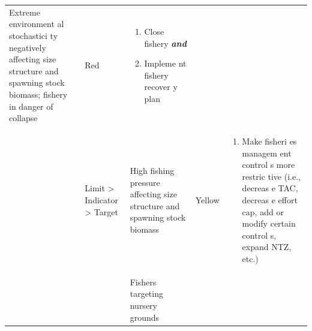 \documentclass[]{book}
\providecommand{\tightlist}{%
  \setlength{\itemsep}{0pt}\setlength{\parskip}{0pt}}
\begin{document}
\begin{longtable}[]{@{}lllll@{}}
\begin{minipage}[t]{0.19\columnwidth}
Extreme environment al stochastici ty negatively affecting size
structure and spawning stock biomass; fishery in danger of
collapse\strut
\end{minipage} & \begin{minipage}[t]{0.19\columnwidth}\raggedright\strut
Red\strut
\end{minipage} & \begin{minipage}[t]{0.19\columnwidth}\raggedright\strut
\begin{enumerate}
\def\labelenumi{\arabic{enumi}.}
\item
  Close fishery \textbf{\emph{and} }
\item
  Impleme nt fishery recover y plan
\end{enumerate}\strut
\end{minipage}\tabularnewline
\begin{minipage}[t]{0.19\columnwidth}\raggedright\strut
\strut
\end{minipage} & \begin{minipage}[t]{0.19\columnwidth}\raggedright\strut
Limit \textgreater{} Indicator \textgreater{} Target\strut
\end{minipage} & \begin{minipage}[t]{0.19\columnwidth}\raggedright\strut
High fishing pressure affecting size structure and spawning stock
biomass\strut
\end{minipage} & \begin{minipage}[t]{0.19\columnwidth}\raggedright\strut
Yellow\strut
\end{minipage} & \begin{minipage}[t]{0.19\columnwidth}\raggedright\strut
\begin{enumerate}
\def\labelenumi{\arabic{enumi}.}
\tightlist
\item
  Make fisheri es managem ent control s more restric tive (i.e., decreas
  e TAC, decreas e effort cap, add or modify certain control s, expand
  NTZ, etc.)
\end{enumerate}\strut
\end{minipage}\tabularnewline
\begin{minipage}[t]{0.19\columnwidth}\raggedright\strut
\strut
\end{minipage} & \begin{minipage}[t]{0.19\columnwidth}\raggedright\strut
\strut
\end{minipage} & \begin{minipage}[t]{0.19\columnwidth}\raggedright\strut
Fishers targeting nursery grounds\strut

\end{minipage}
\end{longtable}
\end{document}
